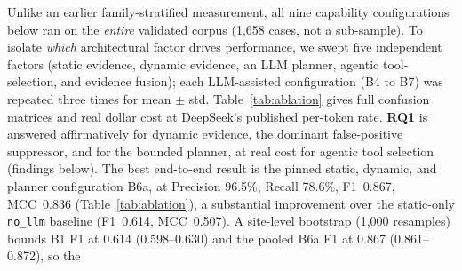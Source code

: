 \documentclass[a4paper]{llncs}
\begin{document}
Unlike an earlier family-stratified measurement, all nine capability
configurations below ran on the \emph{entire} validated corpus (1{,}658
cases, not a sub-sample). To isolate \emph{which} architectural factor
drives performance, we swept five independent factors (static evidence,
dynamic evidence, an LLM planner, agentic tool-selection, and evidence
fusion); each LLM-assisted configuration (B4 to B7) was repeated three
times for mean $\pm$ std. Table~\ref{tab:ablation} gives full confusion
matrices and real dollar cost at DeepSeek's published per-token rate.
\textbf{RQ1} is answered affirmatively for dynamic evidence, the
dominant false-positive suppressor, and for the bounded planner, at real
cost for agentic tool selection (findings below). The best end-to-end
result is the pinned static, dynamic, and planner configuration B6a, at
Precision 96.5\%, Recall 78.6\%, F1~0.867, MCC~0.836
(Table~\ref{tab:ablation}), a substantial improvement over the
static-only \texttt{no\_llm} baseline (F1~0.614, MCC~0.507).
A site-level bootstrap (1{,}000 resamples) bounds B1 F1 at 0.614
(0.598--0.630) and the pooled B6a F1 at 0.867 (0.861--0.872), so the
\end{document}
